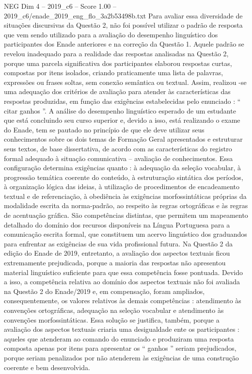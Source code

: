 \begin{textsample}{NEG Dim 4 – 2019\_c6 – Score 1.00 – 2019\_c6/enade\_2019\_eng\_flo\_3a2b53498b.txt}
Para avaliar essa diversidade de situações discursivas da Questão 2, não foi possível utilizar o padrão de resposta que vem sendo utilizado para a avaliação do desempenho linguístico dos participantes dos Enade anteriores e na correção da Questão 1.
Aquele padrão se revelou inadequado para a realidade das respostas analisadas na Questão 2, porque uma parcela significativa dos participantes elaborou respostas curtas, compostas por itens isolados, criando praticamente uma lista de palavras, expressões ou frases soltas, sem conexão semântica ou textual.
Assim, realizou -se uma adequação dos critérios de avaliação para atender às características das respostas produzidas, em função das exigências estabelecidas pelo enunciado : “ citar ganhos ”.
A análise do desempenho linguístico esperado de um estudante que está concluindo seu curso superior e, devido a isso, está realizando o exame do Enade, tem se pautado no princípio de que ele deve utilizar seus conhecimentos sobre os dois temas de Formação Geral apresentados e estruturar seus textos, de base dissertativa, de acordo com as características do registro formal adequado à situação comunicativa – avaliação de conhecimentos.
Essa configuração determina exigências quanto : à adequação da seleção vocabular, à progressão temática coerente do conteúdo, à estruturação sintática dos períodos, à organização lógica das ideias, à utilização de procedimentos de encadeamento textual e de referenciação, à obediência às exigências morfossintáticas próprias da modalidade escrita da norma-padrão, ao respeito às regras ortográficas e às regras de acentuação gráfica.
São competências distintas, que permitem um mapeamento detalhado do domínio dos recursos disponíveis na Língua Portuguesa para a comunicação escrita formal, que constituem um acervo linguístico dos graduandos para enfrentar as exigências de sua vida profissional futura.
Na Questão 2 da edição do Enade de 2019, entretanto, a avaliação dos aspectos textuais ficou extremamente prejudicada, porque a maioria das respostas não apresentou material linguístico suficiente para que essa competência fosse pontuada.
Devido a isso, a competência relativa ao domínio dos aspectos textuais não foi avaliada na Questão 2 do Enade/2019 e, em compensação, foram ampliados, consequentemente, os valores relativos às demais competências : atendimento às convenções ortográficas, adequação na seleção vocabular e atendimento às convenções morfossintáticas.
Essa solução se justifica, também, porque a avaliação dos aspectos textuais criaria uma desigualdade ente os participantes : aqueles que atenderam ao comando do enunciado e produziram uma resposta composta apenas por itens para apresentar os “ ganhos ” seriam prejudicados, porque seriam penalizados por não atenderem às exigências de uma construção coerente e bem desenvolvida.

\end{textsample}
